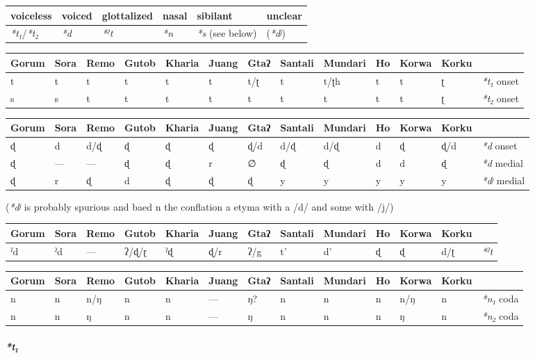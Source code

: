 \documentclass[a4paper,]{article}
\let\oldparagraph\paragraph
\renewcommand{\paragraph}[1]{\oldparagraph{#1}\mbox{}}
\begin{document}
\begin{longtable}[]{@{}llllll@{}}
\toprule
voiceless & voiced & glottalized & nasal & sibilant &
unclear\tabularnewline
\midrule
\endhead
\emph{*t₁}/\emph{*t₂} & \emph{*d} & \emph{*ˀt} & \emph{*n} & \emph{*s}
(see below) & (\emph{*dʲ})\tabularnewline
\bottomrule
\end{longtable}

\begin{longtable}[]{@{}lllllllllllll@{}}
\toprule
Gorum & Sora & Remo & Gutob & Kharia & Juang & Gtaʔ & Santali & Mundari
& Ho & Korwa & Korku &\tabularnewline
\midrule
\endhead
t & t & t & t & t & t & t/ʈ & t & t/ʈh & t & t & ʈ & \emph{*t₁}
onset\tabularnewline
s & s & t & t & t & t & t & t & t & t & t & ʈ & \emph{*t₂}
onset\tabularnewline
\bottomrule
\end{longtable}

\begin{longtable}[]{@{}lllllllllllll@{}}
\toprule
Gorum & Sora & Remo & Gutob & Kharia & Juang & Gtaʔ & Santali & Mundari
& Ho & Korwa & Korku &\tabularnewline
\midrule
\endhead
ɖ & d & d/ɖ & ɖ & ɖ & ɖ & ɖ/d & d/ɖ & d/ɖ & d & ɖ & ɖ/d & \emph{*d}
onset\tabularnewline
ɖ & --- & --- & ɖ & ɖ & r & ∅ & ɖ & ɖ & d & d & ɖ & \emph{*d}
medial\tabularnewline
ɖ & r & ɖ & d & ɖ & ɖ & ɖ & y & y & y & y & y & \emph{*dʲ}
medial\tabularnewline
\bottomrule
\end{longtable}

(\emph{*dʲ} is probably spurious and baed n the conflation a etyma with
a /d/ and some with /j/)

\begin{longtable}[]{@{}lllllllllllll@{}}
\toprule
Gorum & Sora & Remo & Gutob & Kharia & Juang & Gtaʔ & Santali & Mundari
& Ho & Korwa & Korku &\tabularnewline
\midrule
\endhead
ˀd & ˀd & --- & ʔ/ɖ/ɽ & ˀɖ & ɖ/r & ʔ/g & t' & d' & ɖ & ɖ & d/ʈ &
\emph{*ˀt}\tabularnewline
\bottomrule
\end{longtable}

\begin{longtable}[]{@{}lllllllllllll@{}}
\toprule
Gorum & Sora & Remo & Gutob & Kharia & Juang & Gtaʔ & Santali & Mundari
& Ho & Korwa & Korku &\tabularnewline
\midrule
\endhead
n & n & n/ŋ & n & n & --- & ŋ? & n & n & n & n/ŋ & n & \emph{*n₁}
coda\tabularnewline
n & n & ŋ & n & n & --- & ŋ & n & n & n & ŋ & n & \emph{*n₂}
coda\tabularnewline
\bottomrule
\end{longtable}

\paragraph{\texorpdfstring{\emph{*t₁}}{*t₁}}\label{t}
\end{document}

